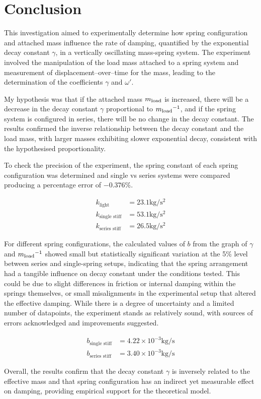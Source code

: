 \section{Conclusion}
\setlength{\parindent}{15pt}

This investigation aimed to experimentally determine how spring configuration and attached mass influence the rate of damping, quantified by the exponential decay constant $\gamma$, in a vertically oscillating mass-spring system. The experiment involved the manipulation of the load mass attached to a spring system and measurement of displacement--over--time for the mass, leading to the determination of the coefficients $\gamma$ and $\omega'$.

 My hypothesis was that if the attached mass $m{\textsubscript{load}}$ is increased, there will be a decrease in the decay constant $\gamma$ proportional to $m{\textsubscript{load}}^{-1}$, and if the spring system is configured in series, there will be no change in the decay constant. The results confirmed the inverse relationship between the decay constant and the load mass, with larger masses exhibiting slower exponential decay, consistent with the hypothesised proportionality.

To check the precision of the experiment, the spring constant of each spring configuration was determined and single vs series systems were compared producing a percentage error of $- 0.376 \%$.

\vspace{-1em}
\begin{align*}
k_{\text{light}} &= 23.1 \si{\kilo\gram\per\second\squared} \\
k_{\text{single stiff}} &= 53.1 \si{\kilo\gram\per\second\squared} \\
k_{\text{series stiff}} &= 26.5 \si{\kilo\gram\per\second\squared}
\end{align*}

For different spring configurations, the calculated values of $b$ from the graph of $\gamma$ and $m{\textsubscript{load}}^{-1}$ showed small but statistically significant variation at the 5\% level between series and single-spring setups, indicating that the spring arrangement had a tangible influence on decay constant under the conditions tested. This could be due to slight differences in friction or internal damping within the springs themselves, or small misalignments in the experimental setup that altered the effective damping. While there is a degree of uncertainty and a limited number of datapoints, the experiment stands as relatively sound, with sources of errors acknowledged and improvements suggested.

\vspace{-1em}
\begin{align*}
b_{\text{single stiff}} &= 4.22 \times 10^{-3} \si{\kilo\gram\per\second} \\
b_{\text{series stiff}} &= 3.40 \times 10^{-3} \si{\kilo\gram\per\second}
\end{align*}

Overall, the results confirm that the decay constant $\gamma$ is inversely related to the effective mass and that spring configuration has an indirect yet measurable effect on damping, providing empirical support for the theoretical model.